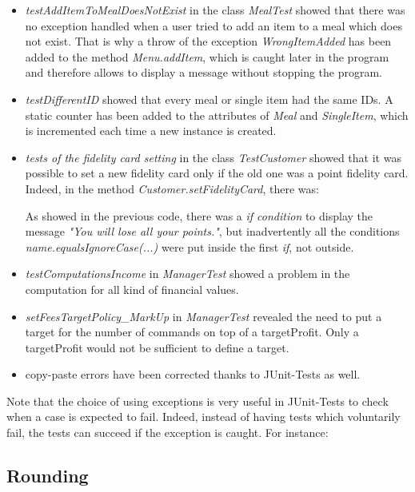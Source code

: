 \begin{itemize}
	\item{\textit{testAddItemToMealDoesNotExist}} in the class \textit{MealTest} showed that there was no exception handled when a user tried to add an item to a meal which does not exist. That is why a throw of the exception \textit{WrongItemAdded} has been added to the method \textit{Menu.addItem}, which is caught later in the program and therefore allows to display a message without stopping the program.
	\item{\textit{testDifferentID}} showed that every meal or single item had the same IDs. A static counter has been added to the attributes of \textit{Meal} and \textit{SingleItem}, which is incremented each time a new instance is created.
	\item{\textit{tests of the fidelity card setting}} in the class \textit{TestCustomer} showed that it was possible to set a new fidelity card only if the old one was a point fidelity card. Indeed, in the method \textit{Customer.setFidelityCard}, there was:

As showed in the previous code, there was a \textit{if condition} to display the message \textit{"You will lose all your points."}, but inadvertently all the conditions \textit{name.equalsIgnoreCase(...)} were put inside the first \textit{if}, not outside.
	\item{\textit{testComputationsIncome}} in \textit{ManagerTest} showed a problem in the 
		computation for all kind of financial values.
	\item{\textit{setFeesTargetPolicy\_MarkUp}} in \textit{ManagerTest} revealed the need to put
		a target for the number of commands on top of a targetProfit. Only a targetProfit 
		would not be sufficient to define a target.	
	\item{} copy-paste errors have been corrected thanks to JUnit-Tests as well.
\end{itemize}
Note that the choice of using exceptions is very useful in JUnit-Tests to check when a case is expected to fail. Indeed, instead of having tests which voluntarily fail, the tests can succeed if the exception is caught. For instance:


\subsection{Rounding}
\label{sub:rounding}

